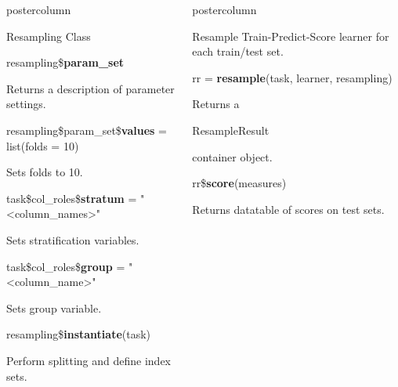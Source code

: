 \documentclass{beamer}
\newlength{\columnheight} %
\newcommand{\codeinline}[1]{\begin{codeboxinline}#1\end{codeboxinline}}
\begin{document}
\begin{withoutheader}
\begin{frame}[fragile]{}
\begin{columns}
\begin{column}{.245\textwidth}
\begin{beamercolorbox}[center]{postercolumn}
\begin{minipage}{.98\textwidth}
{\begin{myblock}{Resampling Class}
							\begin{codebox}
								resampling\$\textbf{param\_set}
							\end{codebox}
							Returns a description of parameter settings.
							\\
							\begin{codebox}
								{\footnotesize resampling\$param\_set\$\textbf{values} = list(folds = 10)}
							\end{codebox}
							Sets folds to 10.
							\\
							\begin{codebox}
								task\$col\_roles\$\textbf{stratum} = "<column\_names>"
							\end{codebox}
							Sets stratification variables.
							\\
							\begin{codebox}
								task\$col\_roles\$\textbf{group} = "<column\_name>"
							\end{codebox}
							Sets group variable.
							\\
							\begin{codebox}
								resampling\$\textbf{instantiate}(task)
							\end{codebox}
                            Perform splitting and define index sets.
						\end{myblock}
					\vfill}
				\end{minipage}
			\end{beamercolorbox}
		\end{column}
		\begin{column}{.245\textwidth}
			\begin{beamercolorbox}[center]{postercolumn}
				\begin{minipage}{.98\textwidth}
					\parbox[t][\columnheight]{\textwidth}{
						\begin{myblock}{Resample}
                            Train-Predict-Score learner for each train/test set.
							\\
							\begin{codebox}
								rr = \textbf{resample}(task, learner, resampling)
							\end{codebox}
							Returns a \codeinline{ResampleResult} container object.
							\\
							\begin{codebox}
								rr\$\textbf{score}(measures)
							\end{codebox}
							Returns datatable of scores on test sets.
							\\

\end{myblock}}
\end{minipage}
\end{beamercolorbox}
\end{column}
\end{columns}
\end{frame}
\end{withoutheader}
\end{document}
